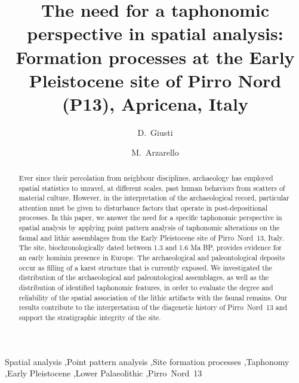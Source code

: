\documentclass[5p,authoryear]{elsarticle} %
\begin{document}
\begin{frontmatter}
  
  \title{The need for a taphonomic perspective in spatial analysis: Formation processes at the Early Pleistocene site of Pirro Nord (P13), Apricena, Italy}
  
  \author[tue]{D.~Giusti}
  
  \author[fe]{M.~Arzarello}
  
  \address[tue]{Paläoanthropologie, Senckenberg Center for Human Evolution and Paleoecology, Eberhard Karls Universität Tübingen, Rümelinstr. 23, 72070 Tübingen, Germany}
  \address[fe]{Dipartimento di Studi Umanistici, Università degli Studi di Ferrara, C.so Ercole I d'Este 32, 44100 Ferrara, Italy}

  \begin{abstract}
Ever since their percolation from neighbour disciplines, archaeology has employed spatial statistics to unravel, at different scales, past human behaviors from scatters of material culture. However, in the interpretation of the archaeological record, particular attention must be given to disturbance factors that operate in post-depositional processes. In this paper, we answer the need for a specific taphonomic perspective in spatial analysis by applying point pattern analysis of taphonomic alterations on the faunal and lithic assemblages from the Early Pleistocene site of Pirro~Nord~13, Italy. The site, biochronologically dated between 1.3 and 1.6 Ma BP, provides evidence for an early hominin presence in Europe. The archaeological and paleontological deposits occur as filling of a karst structure that is currently exposed. We investigated the distribution of the archaeological and paleontological assemblages, as well as the distribution of identified taphonomic features, in order to evaluate the degree and reliability of the spatial association of the lithic artifacts with the faunal remains. Our results contribute to the interpretation of the diagenetic history of Pirro~Nord~13 and support the stratigraphic integrity of the site.
  \end{abstract}

  \begin{keyword}
    Spatial analysis \sep Point pattern analysis \sep Site formation processes \sep Taphonomy \sep Early Pleistocene \sep Lower Palaeolithic \sep Pirro~Nord~13
  \end{keyword}
  
\end{frontmatter}
\end{document}
